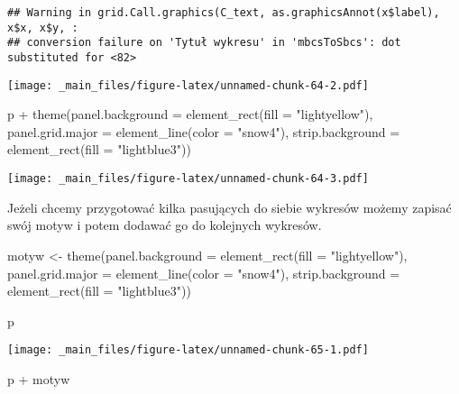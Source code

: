 \documentclass[
]{book}
\newenvironment{Shaded}{\begin{snugshade}}{\end{snugshade}}
\newcommand{\AttributeTok}[1]{\textcolor[rgb]{0.77,0.63,0.00}{#1}}
\newcommand{\FunctionTok}[1]{\textcolor[rgb]{0.00,0.00,0.00}{#1}}
\newcommand{\NormalTok}[1]{#1}
\newcommand{\OtherTok}[1]{\textcolor[rgb]{0.56,0.35,0.01}{#1}}
\newcommand{\SpecialCharTok}[1]{\textcolor[rgb]{0.00,0.00,0.00}{#1}}
\newcommand{\StringTok}[1]{\textcolor[rgb]{0.31,0.60,0.02}{#1}}
\begin{document}
\begin{verbatim}
## Warning in grid.Call.graphics(C_text, as.graphicsAnnot(x$label), x$x, x$y, :
## conversion failure on 'Tytuł wykresu' in 'mbcsToSbcs': dot substituted for <82>
\end{verbatim}

\texttt{[image: \_main\_files/figure-latex/unnamed-chunk-64-2.pdf]}

\begin{Shaded}
\begin{Highlighting}[]
\NormalTok{p }\SpecialCharTok{+} \FunctionTok{theme}\NormalTok{(}\AttributeTok{panel.background =} \FunctionTok{element\_rect}\NormalTok{(}\AttributeTok{fill =} \StringTok{"lightyellow"}\NormalTok{), }
          \AttributeTok{panel.grid.major =} \FunctionTok{element\_line}\NormalTok{(}\AttributeTok{color =} \StringTok{"snow4"}\NormalTok{),}
          \AttributeTok{strip.background =} \FunctionTok{element\_rect}\NormalTok{(}\AttributeTok{fill =} \StringTok{"lightblue3"}\NormalTok{))}
\end{Highlighting}
\end{Shaded}

\texttt{[image: \_main\_files/figure-latex/unnamed-chunk-64-3.pdf]}

Jeżeli chcemy przygotować kilka pasujących do siebie wykresów możemy zapisać swój motyw i potem dodawać go do kolejnych wykresów.

\begin{Shaded}
\begin{Highlighting}[]
\NormalTok{motyw }\OtherTok{\textless{}{-}} \FunctionTok{theme}\NormalTok{(}\AttributeTok{panel.background =} \FunctionTok{element\_rect}\NormalTok{(}\AttributeTok{fill =} \StringTok{"lightyellow"}\NormalTok{), }
               \AttributeTok{panel.grid.major =} \FunctionTok{element\_line}\NormalTok{(}\AttributeTok{color =} \StringTok{"snow4"}\NormalTok{),}
               \AttributeTok{strip.background =} \FunctionTok{element\_rect}\NormalTok{(}\AttributeTok{fill =} \StringTok{"lightblue3"}\NormalTok{))}

\NormalTok{p}
\end{Highlighting}
\end{Shaded}

\texttt{[image: \_main\_files/figure-latex/unnamed-chunk-65-1.pdf]}

\begin{Shaded}
\begin{Highlighting}[]
\NormalTok{p }\SpecialCharTok{+}\NormalTok{ motyw}
\end{Highlighting}
\end{Shaded}
\end{document}
